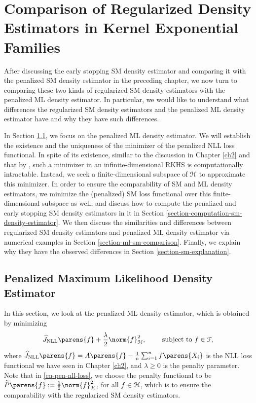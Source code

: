 \chapter{Comparison of Regularized Density Estimators in Kernel Exponential Families}
\label{ch4}

After discussing the early stopping SM density estimator and comparing it with the penalized SM density estimator in the preceding chapter, we now turn to comparing these two kinds of regularized SM density estimators with the penalized ML density estimator. In particular, we would like to understand what differences the regularized SM density estimators and the penalized ML density estimator have and why they have such differences. 

In Section \ref{section-ml-density-estimator}, we focus on the penalized ML density estimator. We will establish the existence and the uniqueness of the minimizer of the penalized NLL loss functional. In spite of its existence, similar to the discussion in Chapter \ref{ch2} and that by \textcite{Gu1993-na}, such a minimizer in an infinite-dimensional RKHS is computationally intractable. Instead, we seek a finite-dimensional subspace of $\mathcal{H}$ to approximate this minimizer. In order to ensure the comparability of SM and ML density estimators, we minimize the (penalized) SM loss functional over this finite-dimensional subspace as well, and discuss how to compute the penalized and early stopping SM density estimators in it in Section \ref{section-computation-sm-density-estimator}. We then discuss the similarities and differences between regularized SM density estimators and penalized ML density estimator via numerical examples in Section \ref{section-ml-sm-comparison}. Finally, we explain why they have the observed differences in Section \ref{section-sm-explanation}. 

\section{Penalized Maximum Likelihood Density Estimator}\label{section-ml-density-estimator}

In this section, we look at the penalized ML density estimator, which is obtained by minimizing 
\begin{align}\label{eq-pen-nll-loss}
	\widehat{J}_{\NLL} \parens{f} + \frac{\lambda}{2} \norm{f}_{\calH}^2, \qquad \text{ subject to } f \in \calF, 
\end{align}
where $\widehat{J}_{\NLL} \parens{f} = A \parens{f} - \frac{1}{n} \sum_{i=1}^n f \parens{X_i}$ is the NLL loss functional we have seen in Chapter \ref{ch2}, and $\lambda \ge 0$ is the penalty parameter. Note that in \eqref{eq-pen-nll-loss}, we choose the penalty functional to be $\widetilde{P} \parens{f} := \frac{1}{2} \norm{f}_{\calH}^2$, for all $f \in \mathcal{H}$, which is to ensure the comparability with the regularized SM density estimators. 

